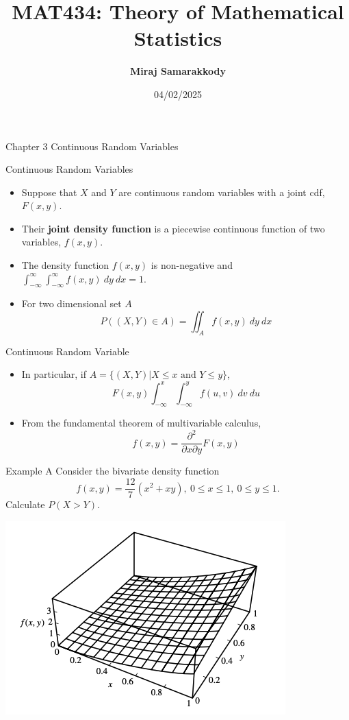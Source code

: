 \documentclass{beamer}
\title{MAT434: Theory of Mathematical Statistics}
\author{\textbf{Miraj Samarakkody}}
\institute{Tougaloo College}
\date{04/02/2025}
\begin{document}
\begin{frame}
    \titlepage
\end{frame}



\begin{frame}{Chapter 3}
    \Huge{Continuous Random Variables}
\end{frame}

\begin{frame}{Continuous Random Variables}
    \begin{itemize}
        \item Suppose that \(X\) and \(Y\) are continuous random variables with a joint cdf, \(F(x,y)\). \pause
        \item Their \textbf{joint density function} is a piecewise continuous function of two variables, \(f(x,y)\). \pause
        \item The density function \(f(x,y)\) is non-negative and \(\int_{-\infty}^{\infty} \int_{-\infty}^{\infty} f(x,y)~dy~dx=1\). \pause
        \item For two dimensional set \(A\) \[P((X,Y) \in A)= \iint_A f(x,y)~dy~dx\]
    \end{itemize}
\end{frame}

\begin{frame}{Continuous Random Variable}
    \begin{itemize}
        \item In particular, if \(A=\{(X,Y)|X \leq x \text{ and }Y \leq y\}\), \[F(x,y) \int_{-\infty}^x \int_{-\infty}^{y} f(u,v)~dv~du\]\pause
        \item From the fundamental theorem of multivariable calculus, \[f(x,y)= \dfrac{\partial^2}{\partial x \partial y}F(x,y)\]
    \end{itemize}
\end{frame}

\begin{frame}{Example A}
    Consider the bivariate density function \[f(x,y)=\dfrac{12}{7}(x^2+xy),~0 \leq x \leq 1,~0\leq y \leq 1.\] Calculate \(P(X>Y)\). 

    \includegraphics[scale=0.5]{Figures/fig_7.png}


\end{frame}
\end{document}
